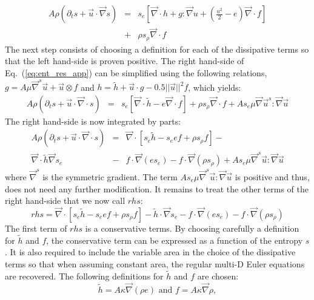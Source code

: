 \documentclass[preprint,10pt]{elsarticle}
\renewcommand{\div}{\vec{\nabla}\! \cdot \!}
\newcommand{\grad}{\vec{\nabla}}
\newcommand{\eqt}[1]{Eq.~(\ref{#1})}                     %
\begin{document}
%
\begin{eqnarray}
\label{eq:ent_res_app}
A \rho \left( \partial_t s + \vec{u} \cdot \grad s \right) &=& s_e \left[ \div h + g : \grad u + \left( \frac{u^2}{2}-e \right) \div f \right] \nonumber\\
&+& \rho s_{\rho} \div f
\end{eqnarray}
%
The next step consists of choosing a definition for each of the dissipative terms so that the left hand-side is proven positive. The right hand-side of \eqt{eq:ent_res_app} can be simplified using the following relations, $g = A \mu \grad^s \vec{u} + \vec{u} \otimes f$ and $h = \tilde{h} + \vec{u} \cdot g - 0.5 || \vec{u} ||^2 f$, which yields:
%
\begin{eqnarray}
\label{eq:ent_res_app2}
A \rho \left( \partial_t s + \vec{u} \cdot \div s \right) &=& s_e \left[ \div \tilde{h}-e \div f \right] + \rho s_{\rho} \div f  + A s_e \mu \grad \vec{u}^s : \grad \vec{u}\nonumber
\end{eqnarray}
%
The right hand-side is now integrated by parts:
%
\begin{eqnarray}
\label{eq:ent_res_app3}
A \rho \left( \partial_t s + \vec{u} \cdot \div s \right) &=& \div \left[ s_e \tilde{h}-s_e e f  + \rho s_{\rho} f \right] -\nonumber \\
\div \tilde{h} \grad s_e  &-& f \cdot \grad (e s_e) -  f \cdot \grad ( \rho s_{\rho} ) + A s_e \mu \grad^s \vec{u} : \grad \vec{u} \nonumber
\end{eqnarray}
%
where $\grad^s$ is the symmetric gradient. The term $A s_e \mu \grad^s \vec{u} : \grad \vec{u}$ is positive and thus, does not need any further modification. It %
remains to treat the other terms of the right hand-side that we now call $rhs$:
%
\begin{equation}
rhs = \div \left[ s_e \tilde{h}-s_e e f  + \rho s_{\rho} f \right] - \tilde{h} \cdot \grad s_e  - f \cdot \grad (e s_e) - f \cdot \grad ( \rho s_{\rho} ) \nonumber
\end{equation}
%
The first term of $rhs$ is a conservative terms. By choosing carefully a definition for $\tilde{h}$ and $f$, the conservative term can be expressed as a function of the entropy $s$. It is also required to include the variable area in the choice of the dissipative terms so that when assuming constant area, the regular multi-D Euler equations are recovered. The following definitions for $\tilde{h}$ and $f$ are chosen:
%
\begin{equation}
\tilde{h} = A \kappa \grad ( \rho e ) \text{ and } f = A \kappa \grad \rho, \nonumber 
\end{equation}
\end{document}
